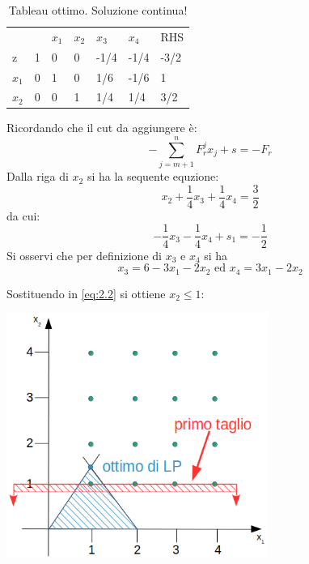 \begin{table}[!h]
	\centering
	\begin{tabular}{lllllll}
				&                         & $x_{1}$ & $x_{2}$  & $x_{3}$ & $x_{4}$ &  RHS  \\ \cline{2-7}
			z	& \multicolumn{1}{|l|}{1} & 0       & 0        & -1/4    & -1/4    & \multicolumn{1}{|l|}{-3/2} \\ \cline{2-7}
		$x_{1}$ & \multicolumn{1}{|l|}{0} & 1       & 0        & 1/6     & -1/6    & \multicolumn{1}{|l|}{1} \\
		$x_{2}$ & \multicolumn{1}{|l|}{0} & 0       & 1        & 1/4     & 1/4     & \multicolumn{1}{|l|}{3/2} \\ \cline{2-7}
	\end{tabular}
	\caption{Tableau ottimo. Soluzione continua!}
\end{table}
Ricordando che il cut da aggiungere è:
\begin{equation*}
-\sum_{j=m+1}^{n} F_{r}^{j} x_{j} + s = -F_{r}
\end{equation*}
Dalla riga di $x_{2}$ si ha la sequente equzione:
\begin{equation*}
	x_{2} + \frac{1}{4} x_{3} + \frac{1}{4} x_{4} = \frac{3}{2}
\end{equation*}
da cui:
\begin{equation}\label{eq:2.2}
-\frac{1}{4}x_{3} - \frac{1}{4} x_{4} + s_{1} = -\frac{1}{2} 
\end{equation}
Si osservi che per definizione di $x_{3}$ e $x_{4}$ si ha
\begin{equation*}
x_{3} = 6 - 3x_{1} - 2x_{2}\text{ ed }x_{4} = 3x_{1} - 2x_{2}
\end{equation*}

Sostituendo in \ref{eq:2.2} si ottiene $x_{2}\le 1$:

\centerline{\includegraphics[height=8cm]{images/graph13.png}}

